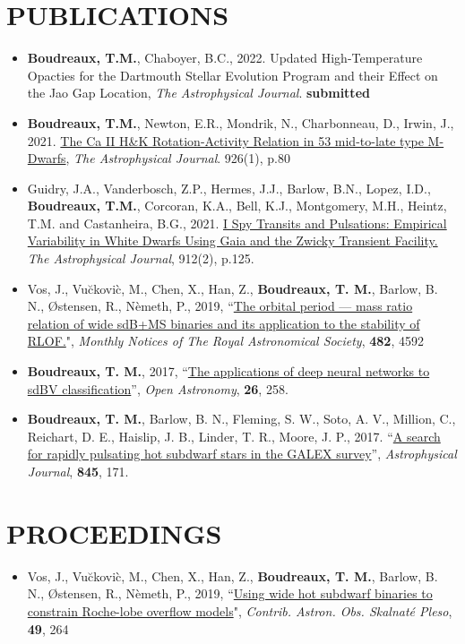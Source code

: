 \documentclass[margin, 10pt]{res} %
\begin{document}
\begin{resume}
\section{PUBLICATIONS}
\begin{itemize}
	\item \textbf{Boudreaux, T.M.}, Chaboyer, B.C., 2022. Updated High-Temperature Opacties for the Dartmouth Stellar Evolution Program and their Effect on the Jao Gap Location, \textit{The Astrophysical Journal}. \textbf{submitted}
	\item \textbf{Boudreaux, T.M.}, Newton, E.R., Mondrik, N., Charbonneau, D., Irwin, J., 2021. \href{https://ui.adsabs.harvard.edu/abs/2022ApJ...929...80B/abstract}{The Ca II H\&K Rotation-Activity Relation in 53 mid-to-late type M-Dwarfs}, \textit{The Astrophysical Journal}. 926(1), p.80
	\item Guidry, J.A., Vanderbosch, Z.P., Hermes, J.J., Barlow, B.N., Lopez, I.D., \textbf{Boudreaux, T.M.}, Corcoran, K.A., Bell, K.J., Montgomery, M.H., Heintz, T.M. and Castanheira, B.G., 2021. \href{https://ui.adsabs.harvard.edu/abs/2021ApJ...912..125G/abstract}{I Spy Transits and Pulsations: Empirical Variability in White Dwarfs Using Gaia and the Zwicky Transient Facility.} \textit{The Astrophysical Journal}, 912(2), p.125.
\item Vos, J., Vu\u{c}kovi\`c, M., Chen, X., Han, Z., \textbf{Boudreaux, T. M.}, Barlow, B. N., \O stensen, R., N\`emeth, P., 2019, ``\href{https://ui.adsabs.harvard.edu/#abs/2019MNRAS.482.4592V/abstract}{The orbital period --- mass ratio relation of wide sdB+MS binaries and its application to the stability of RLOF.}", \textit{Monthly Notices of The Royal Astronomical Society}, \textbf{482}, 4592 
\item \textbf{Boudreaux, T. M.}, 2017, ``\href{https://ui.adsabs.harvard.edu/#abs/2017OAst...26..258B/abstract}{The applications of deep neural networks to sdBV classification}'', \textit{Open Astronomy}, \textbf{26}, 258.
\item \textbf{Boudreaux, T. M.}, Barlow, B. N., Fleming, S. W., Soto, A. V., Million, C., Reichart, D. E., Haislip, J. B., Linder, T. R., Moore, J. P., 2017. ``\href{https://ui.adsabs.harvard.edu/#abs/2017ApJ...845..171B/abstract}{A search for rapidly pulsating hot subdwarf stars in the GALEX survey}'', \textit{Astrophysical Journal}, \textbf{845}, 171.
\end{itemize}

\section{PROCEEDINGS}
\begin{itemize}
\item Vos, J., Vu\u{c}kovi\`c, M., Chen, X., Han, Z., \textbf{Boudreaux, T. M.}, Barlow, B. N., \O stensen, R., N\`emeth, P., 2019, ``\href{http://www.ta3.sk/caosp/Eedition/FullTexts/vol49no2/pp264-270.pdf}{Using wide hot subdwarf binaries to constrain Roche-lobe overflow models}", \textit{Contrib. Astron. Obs. Skalnaté Pleso}, \textbf{49}, 264 
\end{itemize}


\end{resume}
\end{document}
